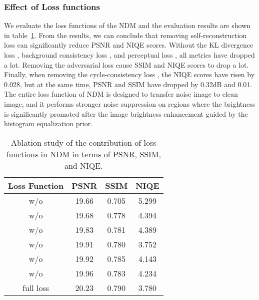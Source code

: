 \documentclass[journal]{IEEEtran}
\begin{document}
\subsubsection{Effect of Loss functions}
We evaluate the loss functions of the NDM and the evaluation results are shown in table~\ref{table:loss2}. From the results, we can conclude that removing self-reconstruction loss  can significantly reduce PSNR and NIQE scores. Without the KL divergence loss , background consistency loss , and perceptual loss , all metrics have dropped a lot. Removing the adversarial loss  cause SSIM and NIQE scores to drop a lot. Finally, when removing the cycle-consistency loss , the NIQE scores have risen by 0.028, but at the same time, PSNR and SSIM have dropped by 0.32dB and 0.01. The entire loss function of NDM is designed to transfer noise image to clean image, and it performs stronger noise suppression on regions where the brightness is significantly promoted after the image brightness enhancement guided by the histogram equalization prior.
\begin{table}[t]
\centering
\caption{Ablation study of the contribution of loss functions in NDM in terms of PSNR, SSIM, and NIQE.}
\begin{tabular}{c|c|c|c}
\hline
\textbf{Loss Function} &\textbf{PSNR} &\textbf{SSIM} &\textbf{NIQE} \\ \hline
w/o  &19.66 &0.705 &5.299\\ 
w/o  &19.68 &0.778 &4.394\\ 
w/o  &19.83 &0.781 &4.389\\
w/o  &19.91 &0.780 &3.752\\
w/o  &19.92 &0.785 &4.143\\
w/o  &19.96 &0.783 &4.234\\ 
full loss &20.23 &0.790 &3.780\\ \hline
\end{tabular}
\label{table:loss2}
\end{table}
\end{document}
